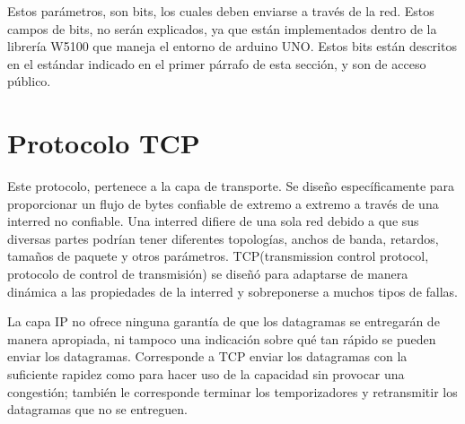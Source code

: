Estos parámetros, son bits, los cuales deben enviarse a través de la red. Estos campos de bits, no serán explicados, ya que están implementados dentro de la librería W5100 que maneja el entorno de arduino UNO. Estos bits están descritos en el estándar indicado en el primer párrafo de esta sección, y son de acceso público. 


\section{Protocolo TCP } 
Este protocolo, pertenece a la capa de transporte. Se diseño específicamente para proporcionar un flujo de bytes confiable de extremo a extremo a través de una interred no confiable. Una interred difiere de una sola red debido a que sus diversas partes podrían tener diferentes topologías, anchos de banda, retardos, tamaños de paquete y otros parámetros. TCP(transmission control protocol, protocolo de control de transmisión) se diseñó para adaptarse de manera dinámica a las propiedades de la interred y sobreponerse a muchos tipos de fallas.



La capa IP no ofrece ninguna garantía de que los datagramas se entregarán de manera apropiada, ni tampoco una indicación sobre qué tan rápido se pueden enviar los datagramas. Corresponde a TCP enviar los datagramas con la suficiente rapidez como para hacer uso de la capacidad sin provocar una congestión; también le corresponde terminar los temporizadores y retransmitir los datagramas que no se entreguen. 

